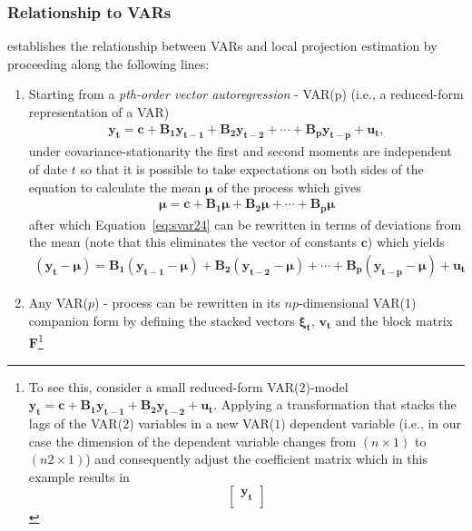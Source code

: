\documentclass[a4paper,11pt,listof=nochaptergap,oneside,pointednumbers,bibtotoc,bigheadings,liststotoc]{scrbook}
\theoremstyle{mysatz}
\theoremstyle{mydefinition}
\theoremstyle{mybemerkung}
\renewcommand*{\paragraph}[1]{\subsubsection*{#1} \vspace{-3mm}} %
\newcommand{\vect}[1]{\boldsymbol{\mathbf{#1}}}
\begin{document}
\begin{itemize}
\paragraph{Relationship to VARs}
\citet{jorda:05} establishes the relationship between VARs and local projection estimation by proceeding along the following lines:
\begin{enumerate}
	\item Starting from a \textit{pth-order vector autoregression} - VAR(p) (i.e., a reduced-form representation of a VAR)
	\begin{equation} \label{eq:svar24}
	\begin{split}
		\vect{y_t} = \vect{c} + \vect{B_1}\vect{y_{t-1}} + \vect{B_2}\vect{y_{t-2}} + \cdots + \vect{B_p}\vect{y_{t-p}} + \vect{u_t},
	\end{split}								
	\end{equation}	
	under covariance-stationarity the first and second moments are independent of date $t$ so that it is possible to take expectations on both sides of the equation to calculate the mean $\vect{\mu}$ of the process which gives
	\begin{equation} \label{eq:svar25}
	\begin{split}
		\vect{\mu} = \vect{c} + \vect{B_1}\vect{\mu} + \vect{B_2}\vect{\mu}+\cdots + \vect{B_p}\vect{\mu}
	\end{split}								
	\end{equation}	
	after which Equation~\ref{eq:svar24} can be rewritten in terms of deviations from the mean (note that this eliminates the vector of constants $\vect{c}$) which yields
	\begin{equation} \label{eq:svar26}
	\begin{split}
		(\vect{y_t} - \vect{\mu}) = \vect{B_1}(\vect{y_{t-1}} - \vect{\mu}) + \vect{B_2}(\vect{y_{t-2}} - \vect{\mu}) + \cdots + \vect{B_p}(\vect{y_{t-p}} - \vect{\mu}) + \vect{u_t}
	\end{split}								
	\end{equation}	
	\item Any VAR($p$) - process can be rewritten in its $np$-dimensional VAR(1) companion form by defining the stacked vectors $\vect{\xi_t}$, $\vect{v_t}$ and the block matrix $\vect{F}$\footnote{To see this, consider a small reduced-form VAR($2$)-model $\vect{y_t} = \vect{c} + \vect{B_1}\vect{y_{t-1}} + \vect{B_2}\vect{y_{t-2}} + \vect{u_t}$. Applying a transformation that stacks the lags of the VAR($2$) variables in a new VAR($1$) dependent variable (i.e., in our case the dimension of the dependent variable changes from $(n \times 1)$ to $(n2 \times 1)$) and consequently adjust the coefficient matrix which in this example results in $$\begin{bmatrix} \vect{y_t}\\

\end{bmatrix}$$}
\end{enumerate}
\end{itemize}
\end{document}
